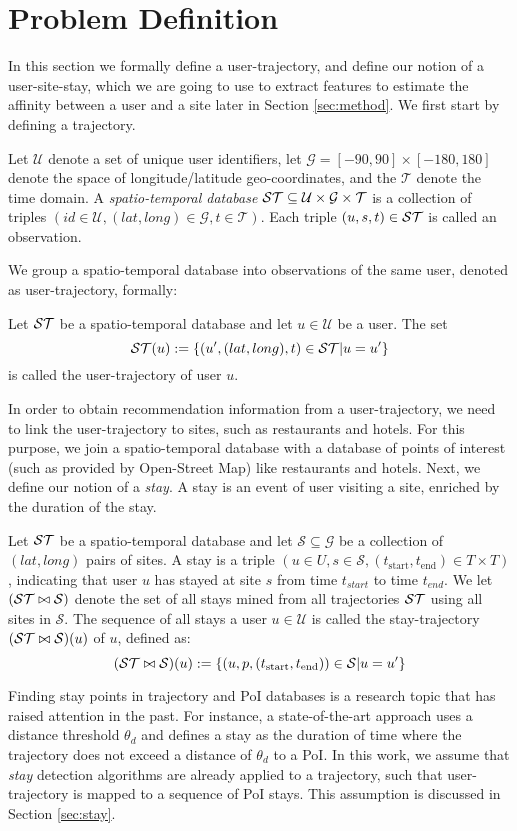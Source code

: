 \section{Problem Definition}
\label{sec:probdef}
In this section we formally define a user-trajectory, and define our notion of a user-site-stay, which we are going 
to use to extract features to estimate the affinity between a user and a site later in Section \ref{sec:method}. 
We first start by defining a trajectory.
\begin{definition}
Let $\mathcal{U}$ denote a set of unique user identifiers, let $\mathcal{G}=[-90,90]\times [-180,180]$ denote the space of longitude/latitude geo-coordinates, and the $\mathcal{T}$ denote the time domain.
A \emph{spatio-temporal database} $\mathcal{ST}\subseteq \mathcal{U}\times \mathcal{G}\times \mathcal{T}$ is a collection of triples $(id\in\mathcal{U},(lat,long)\in\mathcal{G},t\in\mathcal{T})$. Each triple $(u,s,t)\in\mathcal{ST}$ is called an observation.
\end{definition}
We group a spatio-temporal database into observations of the same user, denoted as user-trajectory, formally:
\begin{definition}
Let $\mathcal{ST}$ be a spatio-temporal database and let $u\in\mathcal{U}$ be a user. The set
$$
\mathcal{ST}(u):=\{(u^\prime,(lat,long),t)\in\mathcal{ST}|u=u^\prime\}
$$
is called the user-trajectory of user $u$.
\end{definition}
In order to obtain recommendation information from a user-trajectory, we need to link the user-trajectory to sites, such as restaurants and hotels. For this purpose, we join a spatio-temporal database with a database of points of interest (such as provided by Open-Street Map) like restaurants and hotels. Next, we define our notion of a \emph{stay}. A stay is an event of user visiting a site, enriched by the duration of the stay.
\begin{definition}
Let $\mathcal{ST}$ be a spatio-temporal database and let $\mathcal{S}\subseteq \mathcal{G}$ be a collection of $(lat,long)$ pairs of sites. A stay is a triple $(u\in U,s\in\mathcal{S},(t_\text{start},t_\text{end})\in T\times T)$, indicating that user $u$ has stayed at site $s$ from time $t_{start}$ to time $t_{end}$.
We let $(\mathcal{ST}\bowtie\mathcal{S})$ denote the set of all stays mined from all trajectories $\mathcal{ST}$ using all sites in $\mathcal{S}$. 
The sequence of all stays a user $u\in\mathcal{U}$ is called the stay-trajectory $(\mathcal{ST}\bowtie\mathcal{S})(u)$ of $u$, defined as:
$$
(\mathcal{ST}\bowtie\mathcal{S})(u):=\{(u,p,(t_\text{start},t_\text{end}))\in\mathcal{S}|u=u^\prime\}
$$
\end{definition}
Finding stay points in trajectory and PoI databases is a research topic that has raised attention in the past. For instance, a state-of-the-art approach \cite{li2008mining,zheng2009mining,zheng2010geolife,xiao2010finding} uses a distance threshold $\theta_{d}$ and defines a stay as the duration of time where the trajectory does not exceed a distance of $\theta_{d}$ to a PoI. In this work, we assume that \emph{stay} detection algorithms are already applied to a trajectory, such that user-trajectory is mapped to a sequence of PoI stays. This assumption is discussed in Section \ref{sec:stay}.

